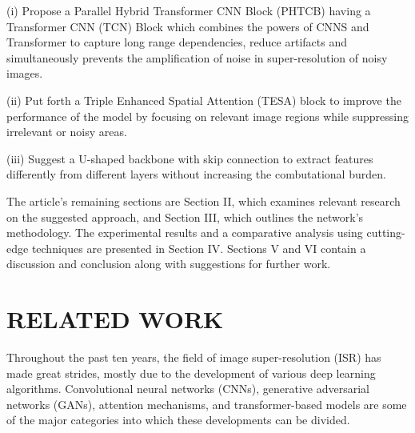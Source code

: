 \documentclass{ieeeaccess}
\begin{document}
(i)	Propose a Parallel Hybrid Transformer CNN Block (PHTCB) having a Transformer CNN (TCN) Block which combines the powers of CNNS and Transformer to capture long range dependencies, reduce artifacts and simultaneously prevents the amplification of noise in super-resolution of noisy images.

(ii)	Put forth a Triple Enhanced Spatial Attention (TESA) block to improve the performance of the model by focusing on relevant image regions while suppressing irrelevant or noisy areas.

(iii)	Suggest a U-shaped backbone with skip connection to extract features differently from different layers without increasing the combutational burden.

The article's remaining sections are Section II, which examines relevant research on the suggested approach, and Section III, which outlines the network's methodology. The experimental results and a comparative analysis using cutting-edge techniques are presented in Section IV. Sections V and VI contain a discussion and conclusion along with suggestions for further work.

\section{RELATED WORK}
Throughout the past ten years, the field of image super-resolution (ISR) has made great strides, mostly due to the development of various deep learning algorithms. Convolutional neural networks (CNNs), generative adversarial networks (GANs), attention mechanisms, and transformer-based models are some of the major categories into which these developments can be divided.
\end{document}
